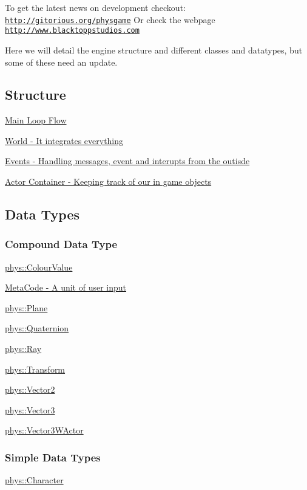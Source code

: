 To get the latest news on development checkout: \href{http://gitorious.org/physgame}{\tt http://gitorious.org/physgame} Or check the webpage \href{http://www.blacktoppstudios.com}{\tt http://www.blacktoppstudios.com}

Here we will detail the engine structure and different classes and datatypes, but some of these need an update.\hypertarget{index_Engine}{}\subsection{Structure}\label{index_Engine}
\hyperlink{mainloop1}{Main Loop Flow}

\hyperlink{classphys_1_1World}{World -\/ It integrates everything}

\hyperlink{classphys_1_1EventManager}{Events -\/ Handling messages, event and interupts from the outisde}

\hyperlink{actorcontainer1}{Actor Container -\/ Keeping track of our in game objects}\hypertarget{index_Types}{}\subsection{Data Types}\label{index_Types}
\hypertarget{index_CompoundTypes}{}\subsubsection{Compound Data Type}\label{index_CompoundTypes}
\hyperlink{classphys_1_1ColourValue}{phys::ColourValue}

\hyperlink{classphys_1_1MetaCode}{MetaCode -\/ A unit of user input}

\hyperlink{classphys_1_1Plane}{phys::Plane}

\hyperlink{classphys_1_1Quaternion}{phys::Quaternion}

\hyperlink{classphys_1_1Ray}{phys::Ray}

\hyperlink{classphys_1_1Transform}{phys::Transform}

\hyperlink{classphys_1_1Vector2}{phys::Vector2}

\hyperlink{classphys_1_1Vector3}{phys::Vector3}

\hyperlink{classphys_1_1Vector3WActor}{phys::Vector3WActor}\hypertarget{index_SimpleDataTypes}{}\subsubsection{Simple Data Types}\label{index_SimpleDataTypes}
\hyperlink{namespacephys_a3098bae5b0a3cd16eec331f766cc562b}{phys::Character}

